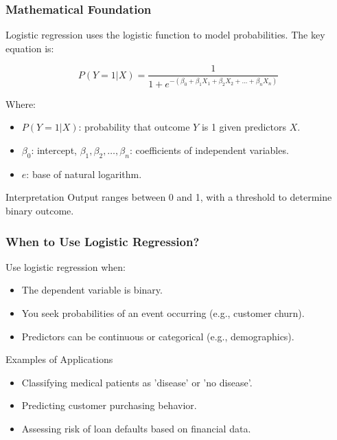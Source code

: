 \documentclass[aspectratio=169]{beamer}
\begin{document}
\begin{frame}[fragile]
    \frametitle{Mathematical Foundation}
    Logistic regression uses the logistic function to model probabilities. The key equation is:
    
    \begin{equation}
        P(Y=1|X) = \frac{1}{1 + e^{-(\beta_0 + \beta_1X_1 + \beta_2X_2 + ... + \beta_nX_n)}}
    \end{equation}
    
    Where:
    \begin{itemize}
        \item \(P(Y=1|X)\): probability that outcome \(Y\) is 1 given predictors \(X\).
        \item \(\beta_0\): intercept, \(\beta_1, \beta_2, \ldots, \beta_n\): coefficients of independent variables.
        \item \(e\): base of natural logarithm.
    \end{itemize}
    
    \begin{block}{Interpretation}
        Output ranges between 0 and 1, with a threshold to determine binary outcome.
    \end{block}
\end{frame}

\begin{frame}[fragile]
    \frametitle{When to Use Logistic Regression?}
    Use logistic regression when:
    \begin{itemize}
        \item The dependent variable is binary.
        \item You seek probabilities of an event occurring (e.g., customer churn).
        \item Predictors can be continuous or categorical (e.g., demographics).
    \end{itemize}

    \begin{block}{Examples of Applications}
        \begin{itemize}
            \item Classifying medical patients as 'disease' or 'no disease'.
            \item Predicting customer purchasing behavior.
            \item Assessing risk of loan defaults based on financial data.
        \end{itemize}
    \end{block}
\end{frame}
\end{document}
